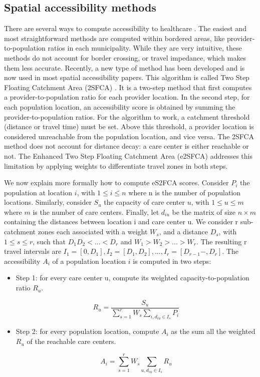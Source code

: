 \subsection{Spatial accessibility methods}

There are several ways to compute accessibility to healthcare \cite{guagliardo_spatial_2004}. The easiest and most straightforward methods are computed within bordered areas, like provider-to-population ratios in each municipality. While they are very intuitive, these methods do not account for border crossing, or travel impedance, which makes them less accurate. Recently, a new type of method has been developed and is now used in most spatial accessibility papers. This algorithm is called Two Step Floating Catchment Area (2SFCA) \cite{luo_using_2004}. It is a two-step method that first computes a provider-to-population ratio for each provider location. In the second step, for each population location, an accessibility score is obtained by summing the provider-to-population ratios. For the algorithm to work, a catchment threshold (distance or travel time) must be set. Above this threshold, a provider location is considered unreachable from the population location, and vice versa. The 2SFCA method does not account for distance decay: a care center is either reachable or not. The Enhanced Two Step Floating Catchment Area (e2SFCA) \cite{luo_enhanced_2009} addresses this limitation by applying weights to differentiate travel zones in both steps.

We now explain more formally how to compute eS2FCA scores. Consider $P_i$ the population at location $i$, with $1 \leq i \leq n$ where n is the number of population locations. Similarly, consider $S_u$ the capacity of care center $u$, with $1 \leq u \leq m$ where $m$ is the number of care centers. Finally, let $d_{iu}$ be the matrix of size $n \times m$ containing the distances between location i and care center u. We consider r sub-catchment zones each associated with a weight $W_s$, and a distance $D_s$, with $1 \leq s \leq r$, such that $D_1 D_2 < ... < D_r$ and $W_1 > W_2 > ... > W_r$. The resulting r travel intervals are $I_1=[0, D_1], I_2=[D_1, D_2 ], ... ,I_r=[D_{r-1}-,D_r]$. The accessibility $A_i$ of a population location $i$ is computed in two steps:

\begin{itemize}
    \item Step 1: for every care center u, compute its weighted capacity-to-population ratio $R_u$.

    \begin{equation}
    R_u =  \frac{S_u}{\sum_{s=1}^{r} W_s \sum_{i, d_{iu} \in I_s} P_i}
    \end{equation}

    \item Step 2: for every population location, compute $A_i$ as the sum all the weighted $R_u$ of the reachable care centers.

    \begin{equation}
    A_i = \sum_{s=1}^{r} W_s \sum_{u, d_{iu} \in I_s} R_u
    \end{equation}
\end{itemize}

